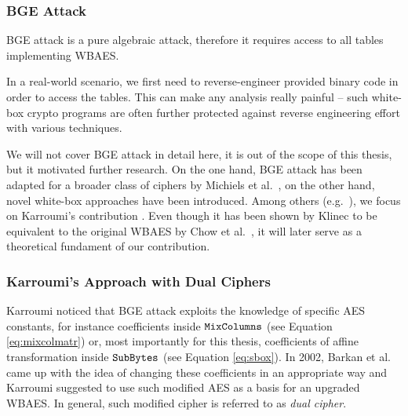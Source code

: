 
\subsubsection{BGE Attack}
	
	BGE attack is a pure algebraic attack, therefore it requires access to all tables implementing WBAES.
	
	\begin{note}
	\label{note:reverse}
		In a real-world scenario, we first need to reverse-engineer provided binary code in order to access the tables. This can make any analysis really painful -- such white-box crypto programs are often further protected against reverse engineering effort with various techniques.
	\end{note}
	
	We will not cover BGE attack in detail here, it is out of the scope of this thesis, but it motivated further research. On the one hand, BGE attack has been adapted for a broader class of ciphers by Michiels et al.\ \cite{michiels2008cryptanalysis}, on the other hand, novel white-box approaches have been introduced. Among others (e.g.\ \cite{michiels2007cryptographic, xiao2009secure}), we focus on Karroumi's contribution \cite{karroumi2011protecting}. Even though it has been shown by Klinec \cite{klinec2013white} to be equivalent to the original WBAES by Chow et al.\ \cite{chow2002aes}, it will later serve as a theoretical fundament of our contribution.

\subsubsection{Karroumi's Approach with Dual Ciphers}
	
	Karroumi noticed that BGE attack exploits the knowledge of specific AES constants, for instance coefficients inside $\texttt{MixColumns}$ (see Equation \ref{eq:mixcolmatr}) or, most importantly for this thesis, coefficients of affine transformation inside $\texttt{SubBytes}$ (see Equation \ref{eq:sbox}). In 2002, Barkan et al.\ \cite{barkan2002many} came up with the idea of changing these coefficients in an appropriate way and Karroumi suggested to use such modified AES as a basis for an upgraded WBAES. In general, such modified cipher is referred to as {\em dual cipher}.
	
